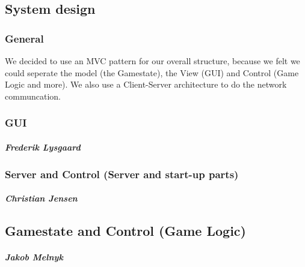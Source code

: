 \subsection{System design}
\subsubsection{General}
We decided to use an MVC pattern for our overall structure, because we felt we could seperate the model (the Gamestate), the View (GUI) and Control (Game Logic and more). We also use a Client-Server architecture to do the network communcation.

\subsubsection{GUI}
\subparagraph{Frederik Lysgaard}

\subsubsection{Server and Control (Server and start-up parts)}
\subparagraph{Christian Jensen}

\subsection{Gamestate and Control (Game Logic)}
\subparagraph{Jakob Melnyk}
